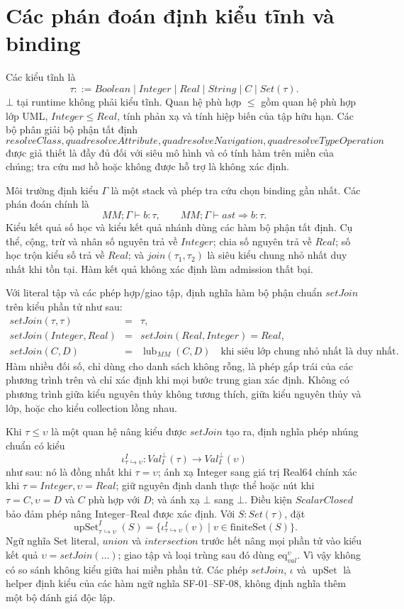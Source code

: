 \documentclass[11pt,a4paper]{article}
\theoremstyle{definition}
\newcommand{\finiteSet}{\mathrm{finiteSet}}
\newcommand{\eqval}{\mathrm{eq}_{val}}
\begin{document}
\section{Các phán đoán định kiểu tĩnh và binding}

Các kiểu tĩnh là
\[
\tau ::= Boolean\mid Integer\mid Real\mid String\mid C\mid Set(\tau).
\]
$\bot$ tại runtime không phải kiểu tĩnh. Quan hệ phù hợp $\leq$ gồm quan hệ phù
hợp lớp UML, $Integer\leq Real$, tính phản xạ và tính hiệp biến của tập hữu hạn.
Các bộ phân giải bộ phận tất định
\[
resolveClass,quad resolveAttribute,quad resolveNavigation,quad
resolveTypeOperation
\]
được giả thiết là đầy đủ đối với siêu mô hình và có tính hàm trên miền của
chúng; tra cứu mơ hồ hoặc không được hỗ trợ là không xác định.

Môi trường định kiểu $\Gamma$ là một stack và phép tra cứu chọn binding gần
nhất. Các phán đoán chính là
\[
MM;\Gamma\vdash b:\tau,
\qquad
MM;\Gamma\vdash ast\Rightarrow b:\tau.
\]
Kiểu kết quả số học và kiểu kết quả nhánh dùng các hàm bộ phận tất định. Cụ thể,
cộng, trừ và nhân số nguyên trả về $Integer$; chia số nguyên trả về $Real$; số
học trộn kiểu số trả về $Real$; và $join(\tau_1,\tau_2)$ là siêu kiểu chung nhỏ
nhất duy nhất khi tồn tại. Hàm kết quả không xác định làm admission thất bại.

Với literal tập và các phép hợp/giao tập, định nghĩa hàm bộ phận chuẩn
$setJoin$ trên kiểu phần tử như sau:
\[
\begin{array}{rcl}
setJoin(\tau,\tau)&=&\tau,\\
setJoin(Integer,Real)&=&setJoin(Real,Integer)=Real,\\
setJoin(C,D)&=&\operatorname{lub}_{MM}(C,D)
\quad\text{khi siêu lớp chung nhỏ nhất là duy nhất}.
\end{array}
\]
Hàm nhiều đối số, chỉ dùng cho danh sách không rỗng, là phép gấp trái của các
phương trình trên và chỉ xác định khi mọi bước trung gian xác định. Không có
phương trình giữa kiểu nguyên thủy không tương thích, giữa kiểu nguyên thủy và
lớp, hoặc cho kiểu collection lồng nhau.

Khi $\tau\leq\upsilon$ là một quan hệ nâng kiểu được $setJoin$ tạo ra, định
nghĩa phép nhúng chuẩn có kiểu
\[
\iota^I_{\tau\hookrightarrow\upsilon}:
Val_I^\bot(\tau)\longrightarrow Val_I^\bot(\upsilon)
\]
như sau: nó là đồng nhất khi $\tau=\upsilon$; ánh xạ Integer sang giá trị
Real64 chính xác khi $\tau=Integer,\upsilon=Real$; giữ nguyên định danh thực
thể hoặc nút khi $\tau=C,\upsilon=D$ và $C$ phù hợp với $D$; và ánh xạ
$\bot$ sang $\bot$. Điều kiện $ScalarClosed$ bảo đảm phép nâng Integer--Real
được xác định. Với $S:Set(\tau)$, đặt
\[
\operatorname{upSet}^{I}_{\tau\hookrightarrow\upsilon}(S)
=\{\iota^I_{\tau\hookrightarrow\upsilon}(v)\mid
v\in\finiteSet(S)\}.
\]
Ngữ nghĩa Set literal, $union$ và $intersection$ trước hết nâng mọi phần tử
vào kiểu kết quả $\upsilon=setJoin(\ldots)$; giao tập và loại trùng sau đó dùng
$\eqval^{\upsilon}$. Vì vậy không có so sánh không kiểu giữa hai miền phần tử.
Các phép $setJoin$, $\iota$ và $\operatorname{upSet}$ là helper định kiểu của
các hàm ngữ nghĩa SF-01--SF-08, không định nghĩa thêm một bộ đánh giá độc lập.
\end{document}

